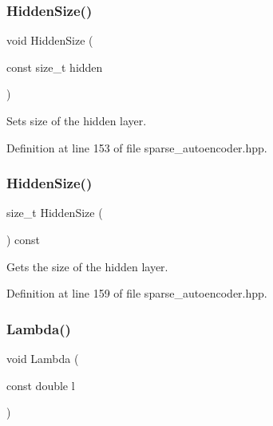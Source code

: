 \subsubsection{Hidden\+Size()\hspace{0.1cm}{\footnotesize\ttfamily [1/2]}}
{\footnotesize\ttfamily void Hidden\+Size (\begin{DoxyParamCaption}\item[{const size\+\_\+t}]{hidden }\end{DoxyParamCaption})\hspace{0.3cm}{\ttfamily [inline]}}



Sets size of the hidden layer. 



Definition at line 153 of file sparse\+\_\+autoencoder.\+hpp.

\mbox{\label{classmlpack_1_1nn_1_1SparseAutoencoder_a820e775a98d21ef0d06283a445e0813a}} 
\subsubsection{Hidden\+Size()\hspace{0.1cm}{\footnotesize\ttfamily [2/2]}}
{\footnotesize\ttfamily size\+\_\+t Hidden\+Size (\begin{DoxyParamCaption}{ }\end{DoxyParamCaption}) const\hspace{0.3cm}{\ttfamily [inline]}}



Gets the size of the hidden layer. 



Definition at line 159 of file sparse\+\_\+autoencoder.\+hpp.

\mbox{\label{classmlpack_1_1nn_1_1SparseAutoencoder_af476ed1916ad9b39eaddd7e7ac108f4b}} 
\subsubsection{Lambda()\hspace{0.1cm}{\footnotesize\ttfamily [1/2]}}
{\footnotesize\ttfamily void Lambda (\begin{DoxyParamCaption}\item[{const double}]{l }\end{DoxyParamCaption})\hspace{0.3cm}{\ttfamily [inline]}}



